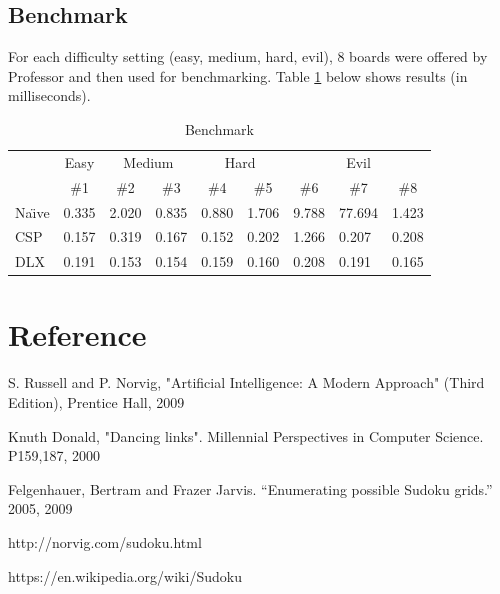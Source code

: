 	\subsection{Benchmark}
		For each difficulty setting (easy, medium, hard, evil), 8 boards were offered by Professor and then used for benchmarking.
		Table \ref{tab:benchmark} below shows results (in milliseconds).

		\begin{table}[ht]
		\centering
		\caption{Benchmark}
		\label{tab:benchmark}
		\begin{tabular}{|l|l|l|l|l|l|l|l|l|}
		\hline
		\multirow{2}{*}{} & \multicolumn{1}{c|}{Easy} & \multicolumn{2}{c|}{Medium} & \multicolumn{2}{c|}{Hard} & \multicolumn{3}{c|}{Evil} \\
		 				\cline{2-9} 
		                  & \multicolumn{1}{c|}{\#1}  & \multicolumn{1}{c|}{\#2} & \multicolumn{1}{c|}{\#3} & \multicolumn{1}{c|}{\#4} & \multicolumn{1}{c|}{\#5} & \multicolumn{1}{c|}{\#6} & \multicolumn{1}{c|}{\#7} & \multicolumn{1}{c|}{\#8} \\ 
		                \hline
		Na\"\i{}ve  & 0.335 & 2.020 & 0.835 & 0.880 & 1.706 & 9.788 & 77.694 & 1.423 \\ 
		\hline
		CSP  & 0.157 & 0.319 & 0.167 & 0.152 & 0.202 & 1.266 & 0.207 & 0.208 \\ 
		\hline
		DLX  & 0.191 & 0.153 & 0.154 & 0.159 & 0.160 & 0.208 & 0.191 & 0.165 \\
		\hline
		\end{tabular}
		\end{table}



\section{Reference}

	\begin{enumerate}[{[1]}]
	\item S. Russell and P. Norvig, "Artificial Intelligence: A Modern Approach" (Third Edition), Prentice Hall, 2009
	\item Knuth Donald, "Dancing links". Millennial Perspectives in Computer Science. P159,187, 2000
	\item Felgenhauer, Bertram and Frazer Jarvis. “Enumerating possible Sudoku grids.” 2005, 2009
	\item http://norvig.com/sudoku.html
	\item https://en.wikipedia.org/wiki/Sudoku
	\end{enumerate}

